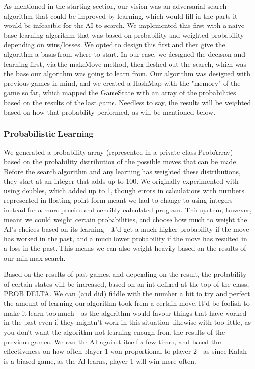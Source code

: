 \documentclass[11pt]{article}
\begin{document}
As mentioned in the starting section, our vision was an adversarial search algorithm that could be improved by learning, which would fill in the parts it would be infeasible for the AI to search. We implemented this first with a naive base learning algorithm that was based on probability and weighted probability depending on wins/losses. We opted to design this first and then give the algorithm a basis from where to start. In our case, we designed the decision and learning first, via the makeMove method, then fleshed out the search, which was the base our algorithm was going to learn from. Our algorithm was designed with previous games in mind, and we created a HashMap with the "memory" of the game so far, which mapped the GameState with an array of the probabilities based on the results of the last game. Needless to say, the results will be weighted based on how that probability performed, as will be mentioned below.

\subsubsection{Probabilistic Learning}
\label{sec-3-2-1}

We generated a probability array (represented in a private class ProbArray) based on the probability distribution of the possible moves that can be made. Before the search algorithm and any learning has weighted these distributions, they start at an integer that adds up to 100. We originally experimented with using doubles, which added up to 1, though errors in calculations with numbers represented in floating point form meant we had to change to using integers instead for a more precise and sensibly calculated program. This system, however, meant we could weight certain probabilities, and choose how much to weight the AI's choices based on its learning - it'd get a much higher probability if the move has worked in the past, and a much lower probability if the move has resulted in a loss in the past. This means we can also weight heavily based on the results of our min-max search.

Based on the results of past games, and depending on the result, the probability of certain states will be increased, based on an int defined at the top of the class, PROB DELTA. We can (and did) fiddle with the number a bit to try and perfect the amount of learning our algorithm took from a certain move. It'd be foolish to make it learn too much - as the algorithm would favour things that have worked in the past even if they mightn't work in this situation, likewise with too little, as you don't want the algorithm not learning enough from the results of the previous games. We ran the AI against itself a few times, and based the effectiveness on how often player 1 won proportional to player 2 - as since Kalah is a biased game, as the AI learns, player 1 will win more often.
\end{document}
